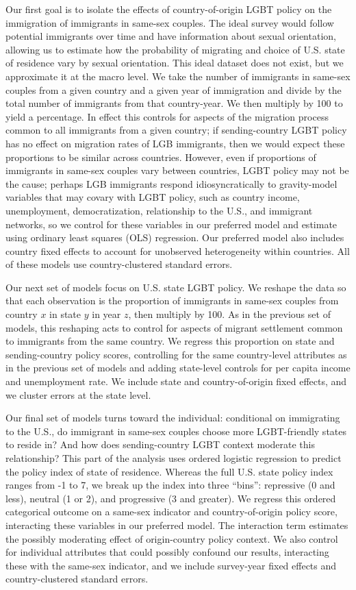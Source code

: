 \documentclass[
  11pt,
]{article}
\begin{document}
Our first goal is to isolate the effects of country-of-origin LGBT policy on the immigration of immigrants in same-sex couples. The ideal survey would follow potential immigrants over time and have information about sexual orientation, allowing us to estimate how the probability of migrating and choice of U.S. state of residence vary by sexual orientation. This ideal dataset does not exist, but we approximate it at the macro level. We take the number of immigrants in same-sex couples from a given country and a given year of immigration and divide by the total number of immigrants from that country-year. We then multiply by 100 to yield a percentage. In effect this controls for aspects of the migration process common to all immigrants from a given country; if sending-country LGBT policy has no effect on migration rates of LGB immigrants, then we would expect these proportions to be similar across countries. However, even if proportions of immigrants in same-sex couples vary between countries, LGBT policy may not be the cause; perhaps LGB immigrants respond idiosyncratically to gravity-model variables that may covary with LGBT policy, such as country income, unemployment, democratization, relationship to the U.S., and immigrant networks, so we control for these variables in our preferred model and estimate using ordinary least squares (OLS) regression. Our preferred model also includes country fixed effects to account for unobserved heterogeneity within countries. All of these models use country-clustered standard errors.

Our next set of models focus on U.S. state LGBT policy. We reshape the data so that each observation is the proportion of immigrants in same-sex couples from country \(x\) in state \(y\) in year \(z\), then multiply by 100. As in the previous set of models, this reshaping acts to control for aspects of migrant settlement common to immigrants from the same country. We regress this proportion on state and sending-country policy scores, controlling for the same country-level attributes as in the previous set of models and adding state-level controls for per capita income and unemployment rate. We include state and country-of-origin fixed effects, and we cluster errors at the state level.

Our final set of models turns toward the individual: conditional on immigrating to the U.S., do immigrant in same-sex couples choose more LGBT-friendly states to reside in? And how does sending-country LGBT context moderate this relationship? This part of the analysis uses ordered logistic regression to predict the policy index of state of residence. Whereas the full U.S. state policy index ranges from -1 to 7, we break up the index into three ``bins'': repressive (0 and less), neutral (1 or 2), and progressive (3 and greater). We regress this ordered categorical outcome on a same-sex indicator and country-of-origin policy score, interacting these variables in our preferred model. The interaction term estimates the possibly moderating effect of origin-country policy context. We also control for individual attributes that could possibly confound our results, interacting these with the same-sex indicator, and we include survey-year fixed effects and country-clustered standard errors.
\end{document}
